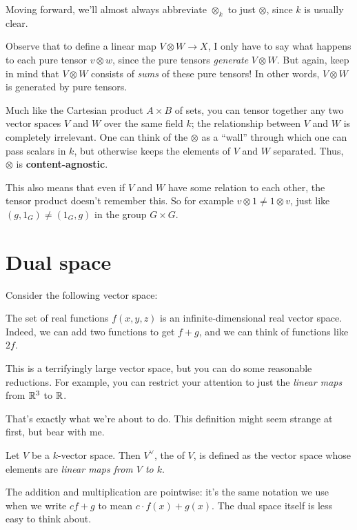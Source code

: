 \begin{abuse}
	Moving forward, we'll almost always abbreviate $\otimes_k$ to just $\otimes$,
	since $k$ is usually clear.
\end{abuse}
\begin{remark}
	Observe that to define a linear map $V \otimes W \to X$,
	I only have to say what happens to each pure tensor $v \otimes w$,
	since the pure tensors \emph{generate} $V \otimes W$.
	But again, keep in mind that
	$V \otimes W$ consists of \emph{sums} of these pure tensors!
	In other words, $V \otimes W$ is generated by pure tensors.
\end{remark}

\begin{remark}
	Much like the Cartesian product $A \times B$ of sets,
	you can tensor together any two vector spaces $V$ and $W$ over the same field $k$;
	the relationship between $V$ and $W$ is completely irrelevant.
	One can think of the $\otimes$ as a ``wall'' through which one can pass
	scalars in $k$, but otherwise keeps the elements of $V$ and $W$ separated.
	Thus, $\otimes$ is \textbf{content-agnostic}.

	This also means that even if $V$ and $W$ have some relation to each other,
	the tensor product doesn't remember this.
	So for example $v \otimes 1 \neq 1 \otimes v$,
	just like $(g,1_G) \neq (1_G,g)$ in the group $G \times G$.
\end{remark}


\section{Dual space}

Consider the following vector space:
\begin{example}
	The set of real functions $f(x,y,z)$ is an
	infinite-dimensional real vector space.
	Indeed, we can add two functions to get $f+g$,
	and we can think of functions like $2f$.
\end{example}
This is a terrifyingly large vector space,
but you can do some reasonable reductions.
For example, you can restrict your attention to just
the \emph{linear maps} from $\mathbb R^3$ to $\mathbb R$.

That's exactly what we're about to do.
This definition might seem strange at first, but bear with me.

\begin{definition}
	Let $V$ be a $k$-vector space.
	Then $V^\vee$, the  of $V$, is defined
	as the vector space whose elements are \emph{linear maps from $V$ to $k$}.
\end{definition}
The addition and multiplication are pointwise:
it's the same notation we use when we write $cf+g$ to mean $c \cdot f(x) + g(x)$.
The dual space itself is less easy to think about.

